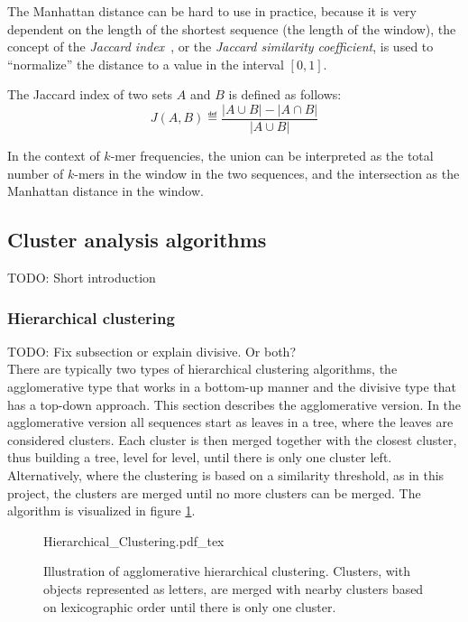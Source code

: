 The Manhattan distance can be hard to use in practice, because it is very
dependent on the length of the shortest sequence (the length of the window),
the concept of the \emph{Jaccard index}~\cite{jaccard1901,jaccard1912}, or the
\emph{Jaccard similarity coefficient}, is used to ``normalize'' the distance to
a value in the interval $[0,1]$.

The Jaccard index of two sets $A$ and $B$ is defined as follows:
\begin{equation}
  J(A, B) \eqdef \frac{|A \cup B| - |A \cap B|}{|A \cup B|}
\end{equation}

In the context of $k$-mer frequencies, the union can be interpreted as the
total number of $k$-mers in the window in the two sequences, and the
intersection as the Manhattan distance in the window.


\subsection{Cluster analysis algorithms}

TODO: Short introduction

\subsubsection{Hierarchical clustering}
TODO: Fix subsection or explain divisive. Or both?\\
There are typically two types of hierarchical clustering algorithms, the
agglomerative type that works in a bottom-up manner and the divisive type that
has a top-down approach. This section describes the agglomerative version. In the 
agglomerative version all sequences start as leaves in a tree, where the leaves are considered 
clusters. Each cluster is then merged together with the closest cluster, thus 
building a tree, level for level, until there is only one cluster left. Alternatively, where the
clustering is based on a similarity threshold, as in this project, the clusters are merged until no more clusters can be merged. The algorithm is visualized in figure \ref{fig:hierarchical_clustering}.

\begin{figure}[h!]
  \centering
  \def\svgwidth{\columnwidth}
  {Hierarchical_Clustering.pdf_tex}
  \caption{Illustration of agglomerative hierarchical clustering. Clusters, with objects represented as letters, are merged with nearby clusters based on lexicographic order until there is only one cluster.}
  \label{fig:hierarchical_clustering}
\end{figure}


